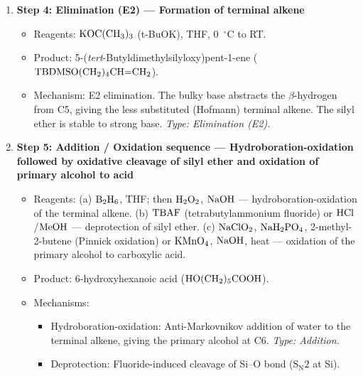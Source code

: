 \documentclass[11pt]{article}
\begin{document}
\begin{corrige}
\begin{enumerate}
\begin{enumerate}
\item \textbf{Step 4: Elimination (E2) — Formation of terminal alkene}
   \begin{itemize}
   \item Reagents: \(\ce{KOC(CH3)3}\) (t-BuOK), THF, \SI{0}{\ensuremath{{}^{\circ}\mathrm{C}}} to RT.
   \item Product: 5-(\textit{tert}-Butyldimethylsilyloxy)pent-1-ene (\(\ce{TBDMSO(CH2)4CH=CH2}\)).
   \item Mechanism: E2 elimination. The bulky base abstracts the \(\beta\)-hydrogen from C5, giving the less substituted (Hofmann) terminal alkene. The silyl ether is stable to strong base. \textit{Type: Elimination (E2).}
   \end{itemize}

\item \textbf{Step 5: Addition / Oxidation sequence — Hydroboration-oxidation followed by oxidative cleavage of silyl ether and oxidation of primary alcohol to acid}
   \begin{itemize}
   \item Reagents: (a) \(\ce{B2H6}\), THF; then \(\ce{H2O2}\), \(\ce{NaOH}\) — hydroboration-oxidation of the terminal alkene. (b) \(\ce{TBAF}\) (tetrabutylammonium fluoride) or \(\ce{HCl}\)/\(\ce{MeOH}\) — deprotection of silyl ether. (c) \(\ce{NaClO2}\), \(\ce{NaH2PO4}\), 2-methyl-2-butene (Pinnick oxidation) or \(\ce{KMnO4}\), \(\ce{NaOH}\), heat — oxidation of the primary alcohol to carboxylic acid.
   \item Product: 6-hydroxyhexanoic acid (\(\ce{HO(CH2)5COOH}\)).
   \item Mechanisms: 
     \begin{itemize}
     \item Hydroboration-oxidation: Anti-Markovnikov addition of water to the terminal alkene, giving the primary alcohol at C6. \textit{Type: Addition.}
     \item Deprotection: Fluoride-induced cleavage of Si–O bond (\(\mathrm{S_N2}\) at Si).

\end{itemize}
\end{itemize}
\end{enumerate}
\end{enumerate}
\end{corrige}
\end{document}

